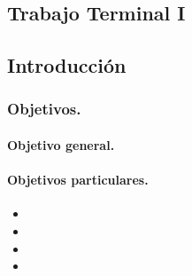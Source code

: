 \documentclass[12pt, a4paper, titlepage]{report}
\begin{document}
	\begin{appendix}
		\renewcommand*\contentsname{{\textcolor{azulescom}{Índice.}}}
		\tableofcontents
		\newpage
		\renewcommand*\listfigurename{{\textcolor{azulescom}{Índice de figuras.}}}
		\listoffigures
		\newpage
		\newpage
		\renewcommand*\listtablename{{\textcolor{azulescom}{Índice de cuadros.}}}
		\listoftables
		
		\newpage
		\renewcommand*\glossaryname{{\textcolor{azulescom}{Glosario.}}}
		
		\printglossary
	\end{appendix}
	
   \textcolor{guindapoli}{\part{Trabajo Terminal I}}
    
    \renewcommand\thechapter{\arabic{chapter}}
    \renewcommand{\appendixname}{Capítulo}
    \renewcommand{\lstlistingname}{C\'odigo}
    \renewcommand{\thepart}{}
    \renewcommand{\partname}{}
    \chapter{\textcolor{azulescom}{Introducción}}
	
	    \lipsum
	    
		
    	\section{Objetivos.}
	    \lipsum[3]
    	
    		\subsection{Objetivo general. }
    		 \lipsum
    		\subsection{Objetivos particulares.}
    			\begin{itemize}
    				\item 	    \lipsum[3]
    				\item 	    \lipsum[3]
    				\item	    \lipsum[3]
    				\item	    \lipsum[3] 
    			\end{itemize}
			
\end{document}

